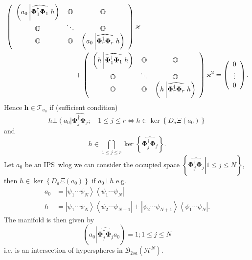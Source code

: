 \documentclass[aps,preprint]{revtex4}%
\begin{document}
\begin{align}
&  \left(
\begin{array}
[c]{ccc}%
\left(  a_{0}\left\vert \widehat{\mathbf{\Phi}_{1}^{\dagger}\mathbf{\Phi}_{1}%
}\right.  h\right)  & \mathbb{O} & \mathbb{O}\\
\mathbb{O} & \ddots & \mathbb{O}\\
\mathbb{O} & \mathbb{O} & \left(  a_{0}\left\vert \widehat{\mathbf{\Phi}%
_{r}^{\dagger}\mathbf{\Phi}_{r}}\right.  h\right)
\end{array}
\right)  \varkappa\nonumber\\
&  \qquad\qquad\qquad\qquad\qquad\left.  +\right.  \left(
\begin{array}
[c]{ccc}%
\left(  h\left\vert \widehat{\mathbf{\Phi}_{1}^{\dagger}\mathbf{\Phi}_{1}%
}\right.  h\right)  & \mathbb{O} & \mathbb{O}\\
\mathbb{O} & \ddots & \mathbb{O}\\
\mathbb{O} & \mathbb{O} & \left(  h\left\vert \widehat{\mathbf{\Phi}%
_{r}^{\dagger}\mathbf{\Phi}_{r}}\right.  h\right)
\end{array}
\right)  \varkappa^{2}=\left(
\begin{array}
[c]{c}%
0\\
\vdots\\
0
\end{array}
\right)  .
\end{align}
Hence $\mathbf{h\in}\mathcal{T}_{a_{0}}$ if (sufficient condition)
\begin{equation}
h\mathbf{\bot}\left(  a_{0}\right\vert \widehat{\mathbf{\Phi}_{j}^{\dagger
}\mathbf{\Phi}_{j}};\quad1\leq j\leq r\Leftrightarrow h\in\ker\left\{
D_{a}\Xi\left(  a_{0}\right)  \right\}
\end{equation}
and
\begin{equation}
h\in\bigcap\limits_{1\leq j\leq r}\ker\left\{  \widehat{\mathbf{\Phi}%
_{j}^{\dagger}\mathbf{\Phi}_{j}}\right\}  .
\end{equation}
Let $a_{0}$ be an IPS\ wlog we can consider the occupied space $\left\{
\left.  \widehat{\mathbf{\Phi}_{j}^{\dagger}\mathbf{\Phi}_{j}}\right\vert
1\leq j\leq N\right\}  $, then $h\in\ker\left\{  D_{a}\Xi\left(  a_{0}\right)
\right\}  $ if $a_{0}\mathbf{\bot}h$ e.g.%
\begin{align}
a_{0}  &  =\left\vert \psi_{1}\cdots\psi_{N}\right\rangle \left\langle
\psi_{1}\cdots\psi_{N}\right\vert \nonumber\\
h  &  =\left\vert \psi_{1}\cdots\psi_{N}\right\rangle \left\langle \psi
_{2}\cdots\psi_{N+1}\right\vert +\left\vert \psi_{2}\cdots\psi_{N+1}%
\right\rangle \left\langle \psi_{1}\cdots\psi_{N}\right\vert .
\end{align}
The manifold is then given by
\begin{equation}
\left(  a_{0}\left\vert \widehat{\mathbf{\Phi}_{j}^{\dagger}\mathbf{\Phi}_{j}%
}a_{0}\right.  \right)  =1;1\leq j\leq N
\end{equation}
i.e. is an intersection of hyperspheres in $\mathcal{B}_{2sa}\left(
\mathcal{H}^{N}\right)  .$
\end{document}
